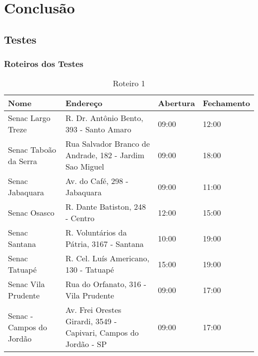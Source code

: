 \chapter{Conclusão}

\section{Testes}

\subsection{Roteiros dos Testes}


\begin{table}[h]
	\centering
	\caption{Roteiro 1}
	\label{Roteiro2}
	\begin{tabular}{C{3cm}C{6cm}C{3cm}C{3cm}}
		\toprule
		Nome                     & Endereço                                                         & Abertura & Fechamento \\ \midrule
		Senac Largo Treze        & R. Dr. Antônio Bento, 393 - Santo Amaro                          & 09:00    & 12:00      \\
		Senac Taboão da Serra    & Rua Salvador Branco de Andrade, 182 - Jardim Sao Miguel          & 09:00    & 18:00      \\
		Senac Jabaquara          & Av. do Café, 298 - Jabaquara                                     & 09:00    & 11:00      \\
		Senac Osasco             & R. Dante Batiston, 248 - Centro                                  & 12:00    & 15:00      \\
		Senac Santana            & R. Voluntários da Pátria, 3167 - Santana                         & 10:00    & 19:00      \\
		Senac Tatuapé            & R. Cel. Luís Americano, 130 - Tatuapé                            & 15:00    & 19:00      \\
		Senac Vila Prudente      & Rua do Orfanato, 316 - Vila Prudente                             & 09:00    & 17:00      \\
		Senac - Campos do Jordão & Av. Frei Orestes Girardi, 3549 - Capivari, Campos do Jordão - SP & 09:00    & 17:00      \\ \bottomrule
	\end{tabular}
\end{table}

